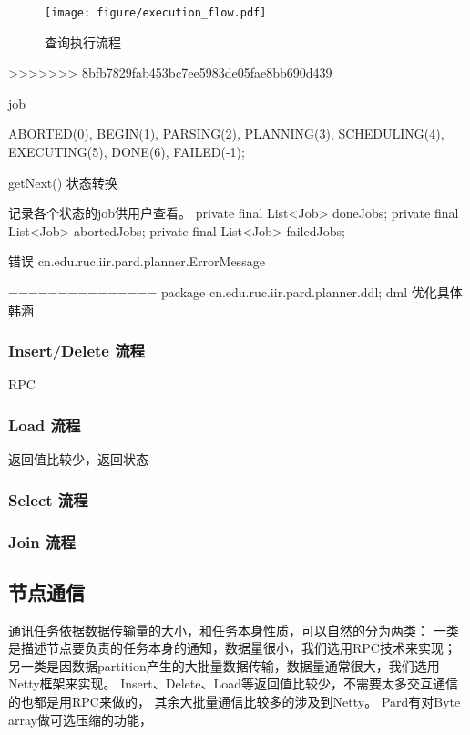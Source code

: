 \documentclass[a4paper, 12pt]{ctexart}
\begin{document}
\begin{figure}[htbp]
	\centering
	\texttt{[image: figure/execution\_flow.pdf]}
	\caption{查询执行流程}
	\label{fig:ef}
\end{figure}
>>>>>>> 8bfb7829fab453bc7ee5983de05fae8bb690d439

job 

ABORTED(0), BEGIN(1), PARSING(2), PLANNING(3), SCHEDULING(4), EXECUTING(5), DONE(6), FAILED(-1);


getNext() 状态转换



记录各个状态的job供用户查看。
private final List<Job> doneJobs;
private final List<Job> abortedJobs;
private final List<Job> failedJobs;


错误
cn.edu.ruc.iir.pard.planner.ErrorMessage



=============== 
package cn.edu.ruc.iir.pard.planner.ddl;
dml  优化具体 韩涵

\subsubsection{Insert/Delete 流程}
RPC

\subsubsection{Load 流程}
返回值比较少，返回状态

\subsubsection{Select 流程}


\subsubsection{Join 流程}



\subsection{节点通信}
通讯任务依据数据传输量的大小，和任务本身性质，可以自然的分为两类：
一类是描述节点要负责的任务本身的通知，数据量很小，我们选用RPC技术来实现；
另一类是因数据partition产生的大批量数据传输，数据量通常很大，我们选用Netty框架来实现。
Insert、Delete、Load等返回值比较少，不需要太多交互通信的也都是用RPC来做的，
其余大批量通信比较多的涉及到Netty。
Pard有对Byte array做可选压缩的功能，
\end{document}
